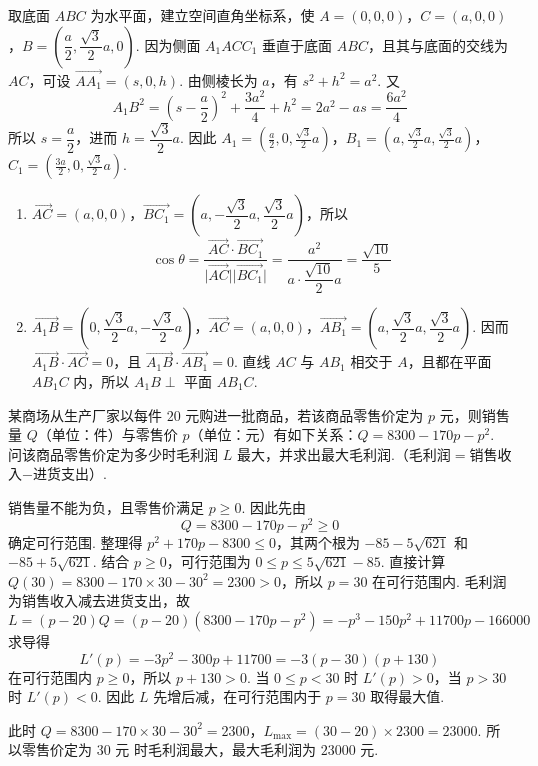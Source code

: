\begin{solution}
取底面 \(ABC\) 为水平面，建立空间直角坐标系，使 \(A=(0,0,0)\)，\(C=(a,0,0)\)，\(B=\left(\dfrac{a}{2},\dfrac{\sqrt{3}}{2}a,0\right)\). 因为侧面 \(A_{1}ACC_{1}\) 垂直于底面 \(ABC\)，且其与底面的交线为 \(AC\)，可设 \(\overrightarrow{AA_{1}}=(s,0,h)\). 由侧棱长为 \(a\)，有 \(s^{2}+h^{2}=a^{2}\). 又
\[
A_{1}B^{2}=\left(s-\frac{a}{2}\right)^{2}+\frac{3a^{2}}{4}+h^{2}=2a^{2}-as=\frac{6a^{2}}{4}
\]
所以 \(s=\dfrac{a}{2}\)，进而 \(h=\dfrac{\sqrt{3}}{2}a\). 因此
\(A_{1}=\left(\frac{a}{2},0,\frac{\sqrt{3}}{2}a\right)\)，\(B_{1}=\left(a,\frac{\sqrt{3}}{2}a,\frac{\sqrt{3}}{2}a\right)\)，\(C_{1}=\left(\frac{3a}{2},0,\frac{\sqrt{3}}{2}a\right)\).

\begin{enumerate}
\item \(\overrightarrow{AC}=(a,0,0)\)，\(\overrightarrow{BC_{1}}=\left(a,-\dfrac{\sqrt{3}}{2}a,\dfrac{\sqrt{3}}{2}a\right)\)，所以
\[
\cos\theta=\frac{\overrightarrow{AC}\cdot\overrightarrow{BC_{1}}}{\lvert\overrightarrow{AC}\rvert\lvert\overrightarrow{BC_{1}}\rvert}=\frac{a^{2}}{a\cdot\dfrac{\sqrt{10}}{2}a}=\frac{\sqrt{10}}{5}
\]
\item \(\overrightarrow{A_{1}B}=\left(0,\dfrac{\sqrt{3}}{2}a,-\dfrac{\sqrt{3}}{2}a\right)\)，\(\overrightarrow{AC}=(a,0,0)\)，\(\overrightarrow{AB_{1}}=\left(a,\dfrac{\sqrt{3}}{2}a,\dfrac{\sqrt{3}}{2}a\right)\). 因而 \(\overrightarrow{A_{1}B}\cdot\overrightarrow{AC}=0\)，且 \(\overrightarrow{A_{1}B}\cdot\overrightarrow{AB_{1}}=0\). 直线 \(AC\) 与 \(AB_{1}\) 相交于 \(A\)，且都在平面 \(AB_{1}C\) 内，所以 \(A_{1}B\perp\) 平面 \(AB_{1}C\).
\end{enumerate}
\end{solution}

\begin{problem}
某商场从生产厂家以每件 \(20\text{ 元}\)购进一批商品，若该商品零售价定为 \(p\text{ 元}\)，则销售量 \(Q\)（单位：\(\text{件}\)）与零售价 \(p\)（单位：\(\text{元}\)）有如下关系：\(Q=8300-170p-p^{2}\). 问该商品零售价定为多少时毛利润 \(L\) 最大，并求出最大毛利润.（毛利润\(=\)销售收入\(-\)进货支出）.
\end{problem}

\begin{solution}
销售量不能为负，且零售价满足 \(p\geqslant0\). 因此先由
\[
Q=8300-170p-p^2\geqslant0
\]
确定可行范围. 整理得 \(p^2+170p-8300\leqslant0\)，其两个根为
\(-85-5\sqrt{621}\) 和 \(-85+5\sqrt{621}\). 结合 \(p\geqslant0\)，可行范围为
\(0\leqslant p\leqslant5\sqrt{621}-85\). 直接计算
\(Q(30)=8300-170\times30-30^2=2300>0\)，所以 \(p=30\) 在可行范围内. 毛利润为销售收入减去进货支出，故
\[
L=(p-20)Q=(p-20)(8300-170p-p^2)
=-p^3-150p^2+11700p-166000
\]
求导得
\[
L'(p)=-3p^2-300p+11700=-3(p-30)(p+130)
\]
在可行范围内 \(p\geqslant0\)，所以 \(p+130>0\). 当 \(0\leqslant p<30\) 时 \(L'(p)>0\)，当 \(p>30\) 时 \(L'(p)<0\). 因此 \(L\) 先增后减，在可行范围内于 \(p=30\) 取得最大值.

此时
\(Q=8300-170\times30-30^2=2300\)，\(L_{\max}=(30-20)\times2300=23000\).
所以零售价定为 \(30\text{ 元}\) 时毛利润最大，最大毛利润为 \(23000\text{ 元}\).
\end{solution}

